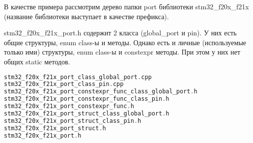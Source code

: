 \begin{enumerate}
	В качестве примера рассмотрим дерево папки port библиотеки stm32\_f20x\_f21x (название библиотеки выступает в качестве префикса).
	
	stm32\_f20x\_f21x\_port.h содержит 2 класса (global\_port и pin). У них есть общие структуры, enum class-ы и методы. Однако есть и личные (используемые только ими) структуры, enum class-ы и constexpr методы. При этом у них нет общих static методов.
	\begin{lstlisting}[language=C++, frame=tlBR, basicstyle=\fontsize{10}{10}\ttfamily]
stm32_f20x_f21x_port_class_global_port.cpp
stm32_f20x_f21x_port_class_pin.cpp 
stm32_f20x_f21x_port_constexpr_func_class_global_port.h
stm32_f20x_f21x_port_constexpr_func_class_pin.h
stm32_f20x_f21x_port_constexpr_func.h
stm32_f20x_f21x_port_struct_class_global_port.h
stm32_f20x_f21x_port_struct_class_pin.h
stm32_f20x_f21x_port_struct.h
stm32_f20x_f21x_port.h\end{lstlisting}\end{enumerate}